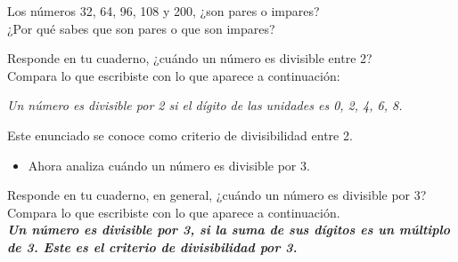 \documentclass[10pt,twoside]{article}
\begin{document}
Los números 32, 64, 96, 108 y 200, ¿son pares o impares?\\
¿Por qué sabes que son pares o que son impares?

Responde en tu cuaderno, ¿cuándo un número es divisible entre 2?\\

Compara lo que escribiste con lo que aparece a continuación:

\emph{Un número es divisible por 2 si el dígito de las unidades es 0, 2, 4, 6, 8.}

Este enunciado se conoce como criterio de divisibilidad entre 2.
\begin{itemize}
 \item Ahora analiza cuándo un número es divisible por 3.
\end{itemize}
Responde en tu cuaderno, en general, ¿cuándo un número es divisible por 3?\\

Compara lo que escribiste con lo que aparece a
continuación.\\

\textbf{\emph{Un número es divisible por 3, si la suma de sus dígitos es un
múltiplo de 3. Este es el criterio de divisibilidad por 3.
}}\\
\end{document}
